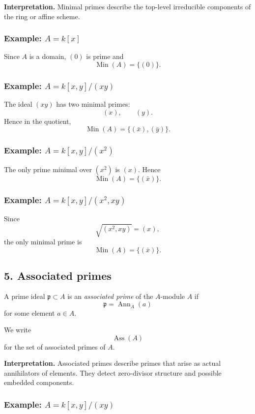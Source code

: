 \documentclass[12pt,a4paper,oneside]{report}
\DeclareMathOperator{\Ass}{Ass}
\DeclareMathOperator{\Ann}{Ann}
\DeclareMathOperator{\Min}{Min}
\theoremstyle{notespace}
\begin{document}
\medskip

\noindent
\textbf{Interpretation.}
Minimal primes describe the top-level irreducible components of the ring or affine scheme.

\subsubsection{Example: \(A=k[x]\)}

Since \(A\) is a domain, \((0)\) is prime and
\[
\Min(A)=\{(0)\}.
\]

\subsubsection{Example: \(A=k[x,y]/(xy)\)}

The ideal \((xy)\) has two minimal primes:
\[
(x),\qquad (y).
\]
Hence in the quotient,
\[
\Min(A)=\{(\bar x),(\bar y)\}.
\]

\subsubsection{Example: \(A=k[x,y]/(x^2)\)}

The only prime minimal over \((x^2)\) is \((x)\). Hence
\[
\Min(A)=\{(\bar x)\}.
\]

\subsubsection{Example: \(A=k[x,y]/(x^2,xy)\)}

Since
\[
\sqrt{(x^2,xy)}=(x),
\]
the only minimal prime is
\[
\Min(A)=\{(\bar x)\}.
\]

\subsection{5. Associated primes}

A prime ideal \(\mathfrak p\subset A\) is an \emph{associated prime} of the \(A\)-module \(A\) if
\[
\mathfrak p=\Ann_A(a)
\]
for some element \(a\in A\).

We write
\[
\Ass(A)
\]
for the set of associated primes of \(A\).

\medskip

\noindent
\textbf{Interpretation.}
Associated primes describe primes that arise as actual annihilators of elements. They detect zero-divisor structure and possible embedded components.

\subsubsection{Example: \(A=k[x,y]/(xy)\)}
\end{document}
